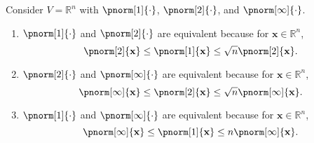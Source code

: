 \documentclass{huhtakm-template-book-v2}
\begin{document}
    \begin{eg}
        Consider $V = \mathbb{R}^{n}$ with $\pnorm[1]{\cdot}$, $\pnorm[2]{\cdot}$, and $\pnorm[\infty]{\cdot}$.
        \begin{enumerate}
            \item $\pnorm[1]{\cdot}$ and $\pnorm[2]{\cdot}$ are equivalent because for $\mathbf{x} \in \mathbb{R}^{n}$,
            \begin{equation*}
                \pnorm[2]{\mathbf{x}} \leq \pnorm[1]{\mathbf{x}} \leq \sqrt{n}\pnorm[2]{\mathbf{x}}.
            \end{equation*}
            \item $\pnorm[2]{\cdot}$ and $\pnorm[\infty]{\cdot}$ are equivalent because for $\mathbf{x} \in \mathbb{R}^{n}$,
            \begin{equation*}
                \pnorm[\infty]{\mathbf{x}} \leq \pnorm[2]{\mathbf{x}} \leq \sqrt{n}\pnorm[\infty]{\mathbf{x}}.
            \end{equation*}
            \item $\pnorm[1]{\cdot}$ and $\pnorm[\infty]{\cdot}$ are equivalent because for $\mathbf{x} \in \mathbb{R}^{n}$,
            \begin{equation*}
                \pnorm[\infty]{\mathbf{x}} \leq \pnorm[1]{\mathbf{x}} \leq n\pnorm[\infty]{\mathbf{x}}.
            \end{equation*}
        \end{enumerate}
    \end{eg}
    \newpage
    
\end{document}
